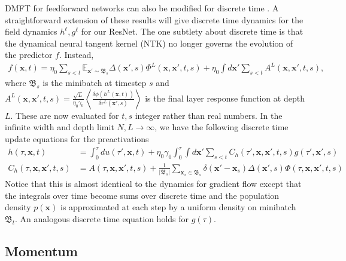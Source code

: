 \documentclass{article} %
\def\x{\bm x}
\begin{document}
DMFT for feedforward networks can also be modified for discrete time \citep{bordelon2022self, bordelon2023dynamics}. A straightforward extension of these results will give discrete time dynamics for the field dynamics $h^\ell, g^\ell$ for our ResNet. The one subtlety about discrete time is that the dynamical neural tangent kernel (NTK) no longer governs the evolution of the predictor $f$. Instead, 
\begin{align}
    f(\x,t) = \eta_0\sum_{s<t}  \mathbb{E}_{\x' \sim \mathfrak{B}_s}  \Delta(\x',s) \Phi^L(\x,\x',t,s) + \eta_0 \int d\x' \sum_{s < t} A^{L}(\x,\x',t,s) ,
\end{align}
where $\mathfrak B_s$ is the minibatch at timestep $s$ and $A^L(\x,\x',t,s) = \frac{\sqrt L}{\eta_0 \gamma_0} \left<  \frac{\delta \phi(h^L(\x,t))}{\delta r^L(\x',s)}\right>$ is the final layer response function at depth $L$. These are now evaluated for $t, s$ integer rather than real numbers. In the infinite width and depth limit $N, L \to \infty$, we have the following discrete time update equations for the preactivations
\begin{align}
    h(\tau,\x,t) &= \int_0^\tau du(\tau',\x,t) + \eta_0 \gamma_0 \int_0^\tau \int d\x' \sum_{s< t} C_h(\tau',\x,\x',t,s) g(\tau',\x',s) \nonumber
    \\
    C_h(\tau,\x,\x',t,s) &= A(\tau,\x,\x',t,s) + \frac{1}{|\mathfrak B_s|} \sum_{\x_s \in \mathfrak B_s} \delta(\x'-\x_s) \Delta(\x',s) \Phi(\tau,\x,\x',t,s)
\end{align}
Notice that this is almost identical to the dynamics for gradient flow except that the integrals over time become sums over discrete time and the population density $p(\x)$ is approximated at each step by a uniform density on minibatch $\mathfrak B_t$. An analogous discrete time equation holds for $g(\tau)$. 

\subsection{Momentum}
\end{document}
